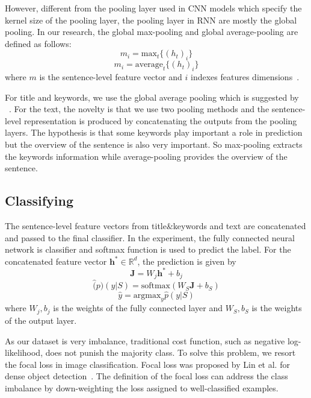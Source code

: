 However, different from the pooling layer used in CNN models which specify the kernel size of the pooling layer, the pooling layer in RNN are mostly the global pooling. In our research, the global max-pooling and global average-pooling are defined as follows:
\begin{equation}
m_i = \mbox{max}_t\{(h_t)_i\}
\end{equation}
\begin{equation}
m_i = \mbox{average}_t\{(h_t)_i\}
\end{equation}
where $m$ is the sentence-level feature vector and $i$ indexes features dimensions~\cite{zhou2016attention}. 

For title and keywords, we use the global average pooling which is suggested by ~\cite{Joulin2016}. For the text, the novelty is that we use two pooling methods and the sentence-level representation is produced by concatenating the outputs from the pooling layers. The hypothesis is that some keywords play important a role in prediction but the overview of the sentence is also very important. So max-pooling extracts the keywords information while average-pooling provides the overview of the sentence.


\subsection{Classifying}
The sentence-level feature vectors from title\&keywords and text are concatenated and passed to the final classifier. In the experiment, the fully connected neural network is classifier and softmax function is used to predict the label. For the concatenated feature vector $\mathbf{h}^* \in \mathbb{R}^{d}$, the prediction is given by
\begin{equation}
\mathbf{J} = W_j \mathbf{h}^* + b_j
\end{equation}
\begin{equation}
\hat(p)(y|S) = \mbox{softmax}(W_S \mathbf{J} + b_S)
\end{equation}
\begin{equation}
\hat{y} = \mbox{argmax}_y \hat{p}(y|S)
\end{equation}
where $W_j, b_j$ is the weights of the fully connected layer and $W_S, b_S$ is the weights of the output layer. 

As our dataset is very imbalance, traditional cost function, such as negative log-likelihood, does not punish the majority class. To solve this problem, we resort the focal loss in image classification. Focal loss was proposed by Lin et al. for dense object detection~\cite{Lin2017}. The definition of the focal loss can address the class imbalance by down-weighting the loss assigned to well-classified examples. 

